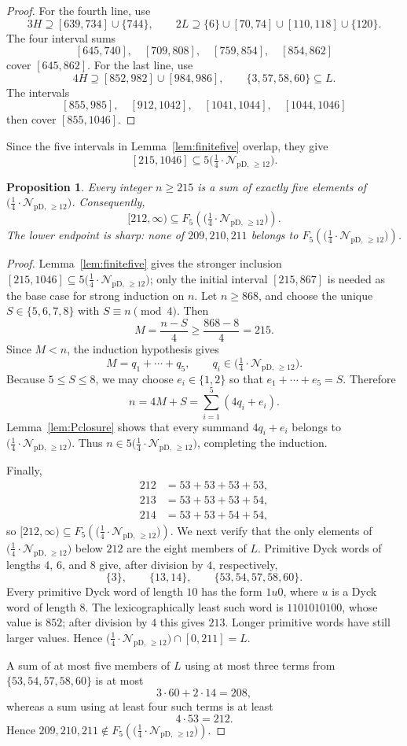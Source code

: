 \documentclass[12pt]{article}
\theoremstyle{plain}
\newtheorem{proposition}[theorem]{Proposition}
\newcommand{\Pset}{\bigl(\tfrac14\cdot
  \mathcal N_{\mathrm{pD,\,\geq12}}\bigr)}
\begin{document}
\begin{proof}
For the fourth line, use
\[
 3H\supseteq[639,734]\cup\{744\},\qquad
 2L\supseteq\{6\}\cup[70,74]\cup[110,118]\cup\{120\}.
\]
The four interval sums
\[
 [645,740],\quad[709,808],\quad[759,854],\quad[854,862]
\]
cover $[645,862]$.  For the last line, use
\[
 4H\supseteq[852,982]\cup[984,986],
 \qquad \{3,57,58,60\}\subseteq L.
\]
The intervals
\[
 [855,985],\quad[912,1042],\quad[1041,1044],\quad[1044,1046]
\]
then cover $[855,1046]$.
\end{proof}

Since the five intervals in Lemma~\ref{lem:finitefive} overlap, they give
\[
 [215,1046]\subseteq5\Pset.
\]

\begin{proposition}\label{prop:fiveP}
Every integer $n\geq215$ is a sum of exactly five elements of $\Pset$.
Consequently,
\[
 [212,\infty)\subseteq F_5(\Pset).
\]
The lower endpoint is sharp: none of $209,210,211$ belongs to
$F_5(\Pset)$.
\end{proposition}

\begin{proof}
Lemma~\ref{lem:finitefive} gives the stronger inclusion
$[215,1046]\subseteq5\Pset$; only the initial interval $[215,867]$ is
needed as the base case for strong induction on $n$.  Let $n\geq868$, and
choose the unique
$S\in\{5,6,7,8\}$ with $S\equiv n\pmod 4$.  Then
\[
 M=\frac{n-S}{4}\geq\frac{868-8}{4}=215.
\]
Since $M<n$, the induction hypothesis gives
\[
 M=q_1+\cdots+q_5,\qquad q_i\in\Pset.
\]
Because $5\leq S\leq8$, we may choose $e_i\in\{1,2\}$ so that
$e_1+\cdots+e_5=S$.  Therefore
\[
 n=4M+S=\sum_{i=1}^{5}(4q_i+e_i).
\]
Lemma~\ref{lem:Pclosure} shows that every summand $4q_i+e_i$ belongs to
$\Pset$.  Thus $n\in5\Pset$, completing the induction.

Finally,
\[
\begin{aligned}
212&=53+53+53+53,\\
213&=53+53+53+54,\\
214&=53+53+54+54,
\end{aligned}
\]
so $[212,\infty)\subseteq F_5(\Pset)$.  We next verify that the only elements of $\Pset$ below $212$ are the
eight members of $L$.  Primitive Dyck words of lengths $4$, $6$, and $8$
give, after division by $4$, respectively,
\[
 \{3\},\qquad \{13,14\},\qquad \{53,54,57,58,60\}.
\]
Every primitive Dyck word of length $10$ has the form $1u0$, where $u$
is a Dyck word of length $8$.  The lexicographically least such word is
$1101010100$, whose value is $852$; after division by $4$ this gives
$213$.  Longer primitive words have still larger values.  Hence
$\Pset\cap[0,211]=L$.

A sum of at most five members of $L$ using at most three terms from
$\{53,54,57,58,60\}$ is at most
\[
 3\cdot60+2\cdot14=208,
\]
whereas a sum using at least four such terms is at least
\[
 4\cdot53=212.
\]
Hence $209,210,211\notin F_5(\Pset)$.
\end{proof}
\end{document}
